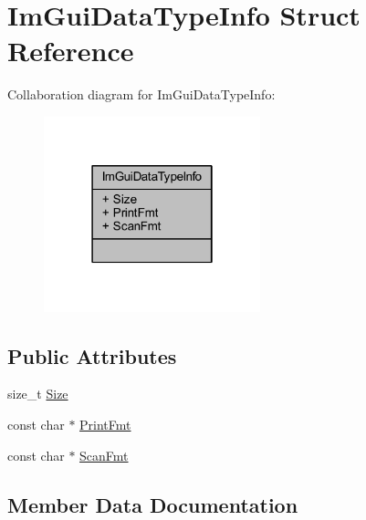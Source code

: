 \hypertarget{struct_im_gui_data_type_info}{}\section{Im\+Gui\+Data\+Type\+Info Struct Reference}
\label{struct_im_gui_data_type_info}


Collaboration diagram for Im\+Gui\+Data\+Type\+Info\+:
\nopagebreak
\begin{figure}[H]
\begin{center}
\leavevmode
\includegraphics[width=178pt]{struct_im_gui_data_type_info__coll__graph}
\end{center}
\end{figure}
\subsection*{Public Attributes}
\begin{DoxyCompactItemize}
\item 
size\+\_\+t \mbox{\hyperlink{struct_im_gui_data_type_info_a49a2b2d99b93b7db968a74d92380ecbf}{Size}}
\item 
const char $\ast$ \mbox{\hyperlink{struct_im_gui_data_type_info_aa66ad5a40cbfe164121fcd0f35abd438}{Print\+Fmt}}
\item 
const char $\ast$ \mbox{\hyperlink{struct_im_gui_data_type_info_aaa2d211e7cc5f03786f82650b69e9cf3}{Scan\+Fmt}}
\end{DoxyCompactItemize}


\subsection{Member Data Documentation}
\mbox{\label{struct_im_gui_data_type_info_aa66ad5a40cbfe164121fcd0f35abd438}} 
